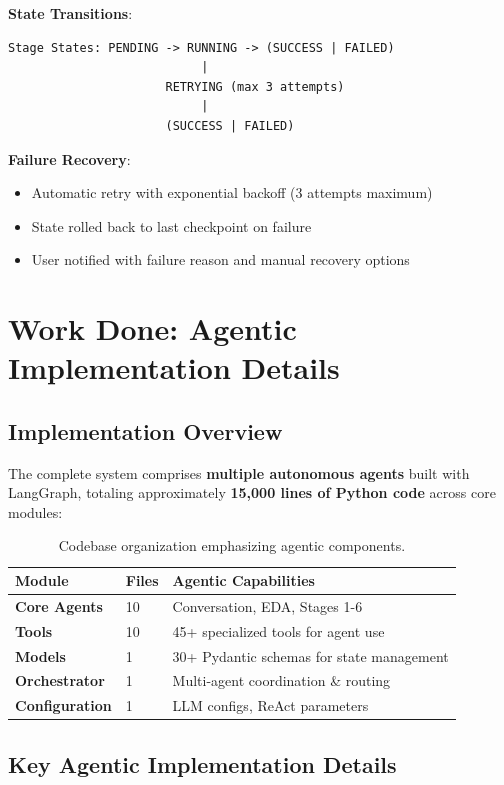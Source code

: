 \documentclass[11pt,a4paper]{article}
\begin{document}
\textbf{State Transitions}:
\begin{verbatim}
Stage States: PENDING -> RUNNING -> (SUCCESS | FAILED)
                           |
                      RETRYING (max 3 attempts)
                           |
                      (SUCCESS | FAILED)
\end{verbatim}

\textbf{Failure Recovery}:
\begin{itemize}
    \item Automatic retry with exponential backoff (3 attempts maximum)
    \item State rolled back to last checkpoint on failure
    \item User notified with failure reason and manual recovery options
\end{itemize}

\section{Work Done: Agentic Implementation Details}

\subsection{Implementation Overview}

The complete system comprises \textbf{multiple autonomous agents} built with LangGraph, totaling approximately \textbf{15,000 lines of Python code} across core modules:

\begin{table}[H]
\centering
\small
\begin{tabular}{lll}
\toprule
\textbf{Module} & \textbf{Files} & \textbf{Agentic Capabilities} \\
\midrule
\textbf{Core Agents} & 10 & Conversation, EDA, Stages 1-6 \\
\textbf{Tools} & 10 & 45+ specialized tools for agent use \\
\textbf{Models} & 1 & 30+ Pydantic schemas for state management \\
\textbf{Orchestrator} & 1 & Multi-agent coordination \& routing \\
\textbf{Configuration} & 1 & LLM configs, ReAct parameters \\
\bottomrule
\end{tabular}
\caption{Codebase organization emphasizing agentic components.}
\end{table}

\subsection{Key Agentic Implementation Details}
\end{document}
